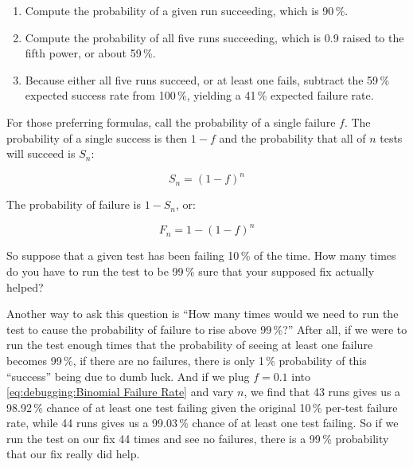 \begin{enumerate}
\item	Compute the probability of a given run succeeding, which is 90\,\%.
\item	Compute the probability of all five runs succeeding, which
	is 0.9 raised to the fifth power, or about 59\,\%.
\item	Because either all five runs succeed, or at least one fails,
	subtract the 59\,\% expected success rate from 100\,\%, yielding
	a 41\,\% expected failure rate.
\end{enumerate}

For those preferring formulas, call the probability of a single failure $f$.
The probability of a single success is then $1-f$ and the probability
that all of $n$ tests will succeed is $S_n$:

\begin{equation}
	S_n = \left(1-f\right)^n
\end{equation}

The probability of failure is $1-S_n$, or:

\begin{equation}
	F_n = 1-\left(1-f\right)^n
\label{eq:debugging:Binomial Failure Rate}
\end{equation}

\QuickQuizEnd

So suppose that a given test has been failing 10\,\% of the time.
How many times do you have to run the test to be 99\,\% sure that
your supposed fix actually helped?

Another way to ask this question is ``How many times would we need
to run the test to cause the probability of failure to rise above 99\,\%?''
After all, if we were to run the test enough times that the probability
of seeing at least one failure becomes 99\,\%, if there are no failures,
there is only 1\,\% probability of this ``success'' being due to dumb luck.
And if we plug $f=0.1$ into
\cref{eq:debugging:Binomial Failure Rate} and vary $n$,
we find that 43 runs gives us a 98.92\,\% chance of at least one test failing
given the original 10\,\% per-test failure rate,
while 44 runs gives us a 99.03\,\% chance of at least one test failing.
So if we run the test on our fix 44 times and see no failures, there
is a 99\,\% probability that our fix really did help.

